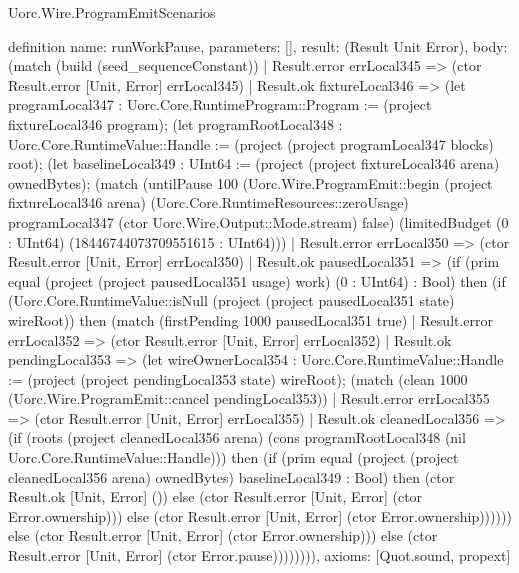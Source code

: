 \begin{lexlean}{Uorc.Wire.ProgramEmitScenarios}
\begin{semanticmodule}
definition{
  name: runWorkPause,
  parameters: [],
  result: (Result Unit Error),
  body: (match (build (seed_sequenceConstant))
    | Result.error errLocal345 => (ctor Result.error [Unit, Error] errLocal345)
    | Result.ok fixtureLocal346 => (let programLocal347 : Uorc.Core.RuntimeProgram::Program := (project fixtureLocal346 program); (let programRootLocal348 : Uorc.Core.RuntimeValue::Handle := (project (project programLocal347 blocks) root); (let baselineLocal349 : UInt64 := (project (project fixtureLocal346 arena) ownedBytes); (match (untilPause 100 (Uorc.Wire.ProgramEmit::begin (project fixtureLocal346 arena) (Uorc.Core.RuntimeResources::zeroUsage) programLocal347 (ctor Uorc.Wire.Output::Mode.stream) false) (limitedBudget (0 : UInt64) (18446744073709551615 : UInt64)))
      | Result.error errLocal350 => (ctor Result.error [Unit, Error] errLocal350)
      | Result.ok pausedLocal351 => (if (prim equal (project (project pausedLocal351 usage) work) (0 : UInt64) : Bool) then (if (Uorc.Core.RuntimeValue::isNull (project (project pausedLocal351 state) wireRoot)) then (match (firstPending 1000 pausedLocal351 true)
        | Result.error errLocal352 => (ctor Result.error [Unit, Error] errLocal352)
        | Result.ok pendingLocal353 => (let wireOwnerLocal354 : Uorc.Core.RuntimeValue::Handle := (project (project pendingLocal353 state) wireRoot); (match (clean 1000 (Uorc.Wire.ProgramEmit::cancel pendingLocal353))
          | Result.error errLocal355 => (ctor Result.error [Unit, Error] errLocal355)
          | Result.ok cleanedLocal356 => (if (roots (project cleanedLocal356 arena) (cons programRootLocal348 (nil Uorc.Core.RuntimeValue::Handle))) then (if (prim equal (project (project cleanedLocal356 arena) ownedBytes) baselineLocal349 : Bool) then (ctor Result.ok [Unit, Error] ()) else (ctor Result.error [Unit, Error] (ctor Error.ownership))) else (ctor Result.error [Unit, Error] (ctor Error.ownership)))))) else (ctor Result.error [Unit, Error] (ctor Error.ownership))) else (ctor Result.error [Unit, Error] (ctor Error.pause)))))))),
  axioms: [Quot.sound, propext]
}


\end{semanticmodule}
\end{lexlean}
